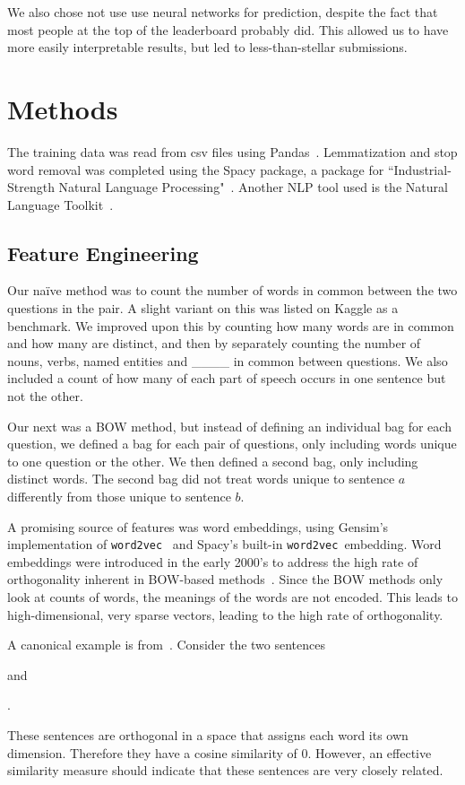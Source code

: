 \documentclass{article} %
\newcommand{\wordtvec}{\texttt{word2vec}}
\begin{document}
We also chose not use use neural networks for prediction, despite the fact that most people at the top of the leaderboard probably did. This allowed us to have more easily interpretable results, but led to less-than-stellar submissions. 

\section{Methods}

The training data was read from csv files using Pandas~\cite{pandas}. Lemmatization and stop word removal was completed using the Spacy package, a package for ``Industrial-Strength Natural Language Processing"~\cite{spacy}. Another NLP tool used is the Natural Language Toolkit~\cite{nltk}.

\subsection{Feature Engineering} \label{sub:features}

Our na\"ive method was to count the number of words in common between the two questions in the pair. A slight variant on this was listed on Kaggle as a benchmark. We improved upon this by counting how many words are in common and how many are distinct, and then by separately counting the number of nouns, verbs, named entities and \_\_\_\_ in common between questions. We also included a count of how many of each part of speech occurs in one sentence but not the other. 

Our next was a BOW method, but instead of defining an individual bag for each question, we defined a bag for each pair of questions, only including words unique to one question or the other. We then defined a second bag, only including distinct words. The second bag did not treat words unique to sentence $a$ differently from those unique to sentence $b$.

A promising source of features was word embeddings, using Gensim's implementation of \wordtvec~\cite{gensim} and Spacy's built-in \wordtvec\ embedding. Word embeddings were introduced in the early 2000's to address the high rate of orthogonality inherent in BOW-based methods~\cite{Bengio03}. Since the BOW methods only look at counts of words, the meanings of the words are not encoded. This leads to high-dimensional, very sparse vectors, leading to the high rate of orthogonality.

A canonical example is from~\cite{kusner15}. Consider the two sentences
\begin{center}
\end{center}
and 
\begin{center}
.
\end{center}
These sentences are orthogonal in a space that assigns each word its own dimension. Therefore they have a cosine similarity of 0. However, an effective similarity measure should indicate that these sentences are very closely related.
\end{document}
